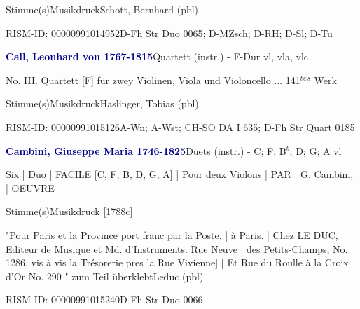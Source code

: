 \documentclass[twocolumn, 12pt]{book}
\begin{document}
\par \textcolor{darkblue}{}  Stimme(s)\newline Musikdruck\newline Schott, Bernhard  (pbl)
\par RISM-ID: 00000991014952\newline D-Fh  Str Duo 0065; D-MZsch; D-RH; D-Sl; D-Tu
\par \vspace{16pt} \textcolor{darkblue}{\textbf{Call, Leonhard von  1767-1815}}\hfillplus{\textbf{[255]}}\newline Quartett (instr.) - F-Dur vl, vla, vlc
\par \begin{itshape}No. III. Quartett [F] für zwey Violinen, Viola und Violoncello ... 141$^t$$^e$$^s$ Werk\end{itshape} 
\par \textcolor{darkblue}{}  Stimme(s)\newline Musikdruck\newline Haslinger, Tobias  (pbl)
\par RISM-ID: 00000991015126\newline A-Wn; A-Wst; CH-SO  DA I 635; D-Fh  Str Quart 0185
\par \vspace{16pt} \textcolor{darkblue}{\textbf{Cambini, Giuseppe Maria  1746-1825}}\hfillplus{\textbf{[256]}}\newline Duets (instr.) - C; F; B$^b$; D; G; A vl
\par \begin{itshape}Six | Duo | FACILE [C, F, B, D, G, A] | Pour deux Violons | PAR | G. Cambini, | OEUVRE\end{itshape} 
\par \textcolor{darkblue}{}  Stimme(s)\newline Musikdruck  [1788c]
\par "Pour Paris et la Province port franc par la Poste. | à Paris. | Chez LE DUC, Editeur de Musique et Md. d'Instruments. Rue Neuve | des Petits-Champs, No. 1286, vis à vis la Trésorerie pres la Rue Vivienne] | Et Rue du Roulle à la Croix d'Or No. 290 " zum Teil überklebt\newline Leduc  (pbl)
\par RISM-ID: 00000991015240\newline D-Fh  Str Duo 0066
\end{document}

